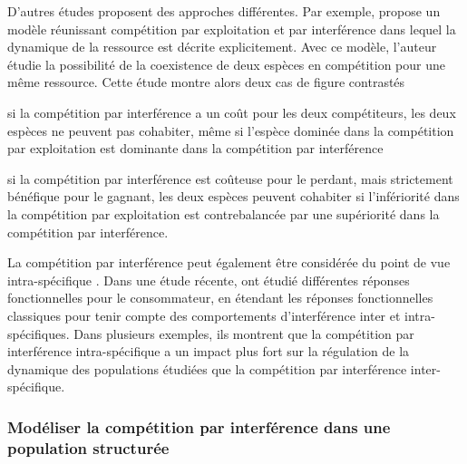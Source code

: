 D'autres études proposent des approches différentes. Par exemple,
\textcite{amarasekare2002a} propose un modèle réunissant compétition par
exploitation et par interférence dans lequel la dynamique de la ressource est
décrite explicitement. Avec ce modèle, l'auteur étudie la possibilité de la
coexistence de deux espèces en compétition pour une même ressource. Cette étude
montre alors deux cas de figure contrastés \begin{enumerate*}[label=(\roman*),
before=\unskip{ : }, itemjoin={{ ; }}, itemjoin*={{ ; et }}] \item si la
compétition par interférence a un coût pour les deux compétiteurs, les deux
espèces ne peuvent pas cohabiter, même si l'espèce dominée dans la compétition
par exploitation est dominante dans la compétition par interférence \item si la
compétition par interférence est coûteuse pour le perdant, mais strictement
bénéfique pour le gagnant, les deux espèces peuvent cohabiter si l'infériorité
dans la compétition par exploitation est contrebalancée par une supériorité dans
la compétition par interférence. \end{enumerate*}

La compétition par interférence peut également être considérée du point de vue
intra-spécifique \autocites{walde1984a, crowley1987a, maddonni2004a,
smallegange2006a}. Dans une étude récente, \textcite{de-villemereuil2011a} ont
étudié différentes réponses fonctionnelles pour le consommateur, en étendant les
réponses fonctionnelles classiques pour tenir compte des comportements
d'interférence inter et intra-spécifiques. Dans plusieurs exemples, ils montrent
que la compétition par interférence intra-spécifique a un impact plus
fort sur la régulation de la dynamique des populations étudiées que la compétition par
interférence inter-spécifique. 

\subsubsection{Modéliser la compétition par interférence dans une population
structurée}

